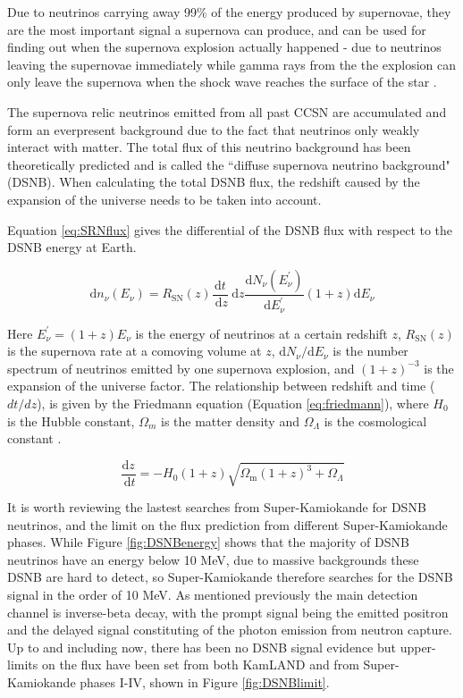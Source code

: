 Due to neutrinos carrying away 99\% of the energy produced by supernovae, they are the most important signal a supernova can produce, and can be used for finding out when the supernova explosion actually happened - due to neutrinos leaving the supernovae immediately while gamma rays from the the explosion can only leave the supernova when the shock wave reaches the surface of the star \cite{bethe_supernova_1990}.

The supernova relic neutrinos emitted from all past CCSN are accumulated and form an everpresent background due to the fact that neutrinos only weakly interact with matter. The total flux of this neutrino background has been theoretically predicted and is called the ``diffuse supernova neutrino background" (DSNB). When calculating the total DSNB flux, the redshift caused by the expansion of the universe needs to be taken into account.

Equation \ref{eq:SRNflux} gives the differential of the DSNB flux with respect to the DSNB energy at Earth.

\begin{equation}
\mathrm{d} n_{\nu}\left(E_{\nu}\right)=R_{\mathrm{SN}}(z) \frac{\mathrm{d} t}{\mathrm{~d} z} \mathrm{~d} z \frac{\mathrm{d} N_{\nu}\left(E_{\nu}^{\prime}\right)}{\mathrm{d} E_{\nu}^{\prime}}(1+z) \mathrm{d} E_{\nu}
\label{eq:SRNflux}
\end{equation}

Here $E_{\nu}^{\prime}=(1+z) E_{\nu}$ is the energy of neutrinos at a certain redshift $z$, $R_{\mathrm{SN}}(z)$ is the supernova rate at a comoving volume at $z$, $\mathrm{d} N_{\nu} / \mathrm{d} E_{\nu}$ is the number spectrum of neutrinos emitted by one supernova explosion, and $(1+z)^{-3}$ is the expansion of the universe factor. The relationship between redshift and time ($dt/dz$), is given by the Friedmann equation (Equation \ref{eq:friedmann}), where $H_{0}$ is the Hubble constant, $\Omega_{m}$ is the matter density and $\Omega_{\Lambda}$ is the cosmological constant \cite{ando_relic_2004}.

\begin{equation}
\frac{\mathrm{d} z}{\mathrm{~d} t}=-H_{0}(1+z) \sqrt{\Omega_{\mathrm{m}}(1+z)^{3}+\Omega_{\Lambda}}
\label{eq:friedmann}
\end{equation}

It is worth reviewing the lastest searches from Super-Kamiokande for DSNB neutrinos, and the limit on the flux prediction from different Super-Kamiokande phases. While Figure \ref{fig:DSNBenergy} shows that the majority of DSNB neutrinos have an energy below 10 MeV, due to massive backgrounds these DSNB are hard to detect, so Super-Kamiokande therefore searches for the DSNB signal in the order of 10 MeV. As mentioned previously the main detection channel is inverse-beta decay, with the prompt signal being the emitted positron and the delayed signal constituting of the photon emission from neutron capture. Up to and including now, there has been no DSNB signal evidence but upper-limits on the flux have been set from both KamLAND and from Super-Kamiokande phases I-IV, shown in Figure \ref{fig:DSNBlimit}.


